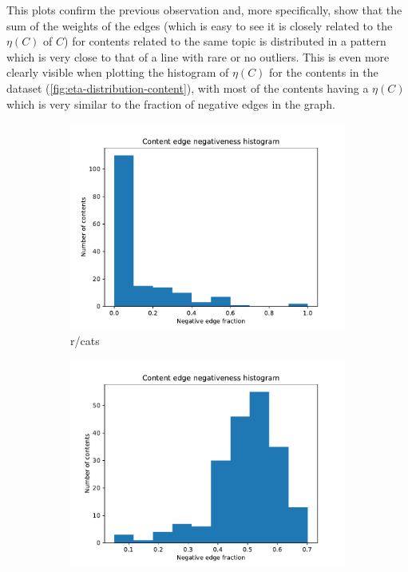 This plots confirm the previous observation and, more specifically, show that
the sum of the weights of the edges (which is easy to see it is closely related
to the $\eta(C)$ of $C$) for contents related to the same topic is distributed in a pattern which is very close to that of a line with rare or no outliers.
This is even more clearly visible when plotting the histogram of $\eta(C)$ for the contents in the dataset
(\autoref{fig:eta-distribution-content}), with most of the contents having a
$\eta(C)$ which is very similar to the fraction of negative edges in the graph.

\begin{figure}
	\begin{center}
		\begin{subfigure}[b]{0.4\textwidth}
			\centering
			\includegraphics[width=\textwidth]{tex/out/cats200/neg-fraction-content-hist.pdf}
			\caption{r/cats}
			\label{fig:tex/out/cats200/neg-fraction-content-hist.pdf}
		\end{subfigure}
		\begin{subfigure}[b]{0.4\textwidth}
			\centering
			\includegraphics[width=\textwidth]{tex/out/asktrumpsupporters200/neg-fraction-content-hist.pdf}

\end{subfigure}
\end{center}
\end{figure}
